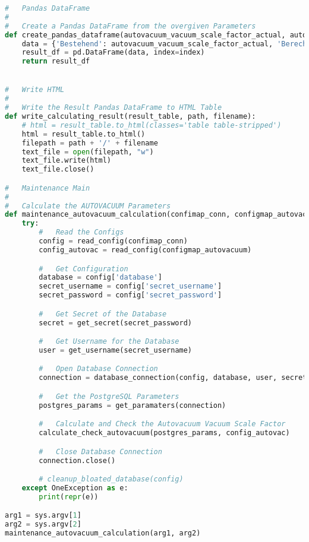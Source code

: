 \begin{flushleft}
\begin{lstlisting}[language=python, caption=Maintenance-Tool - \Gls{AUTOVACUUM} - ksgr\_postgresql\_maintenance\_autovacuum\_calculation.py,captionpos=b,label={lst:maintenannce-tool-autovacuum-python},breaklines=true]
#   Pandas DataFrame
#
#   Create a Pandas DataFrame from the overgiven Parameters
def create_pandas_dataframe(autovacuum_vacuum_scale_factor_actual, autovacuum_vacuum_scale_factor, index):
    data = {'Bestehend': autovacuum_vacuum_scale_factor_actual, 'Berechnet': autovacuum_vacuum_scale_factor}
    result_df = pd.DataFrame(data, index=index)
    return result_df


#   Write HTML
#
#   Write the Result Pandas DataFrame to HTML Table
def write_calculating_result(result_table, path, filename):
    # html = result_table.to_html(classes='table table-stripped')
    html = result_table.to_html()
    filepath = path + '/' + filename
    text_file = open(filepath, "w")
    text_file.write(html)
    text_file.close()

#   Maintenance Main
#
#   Calculate the AUTOVACUUM Parameters
def maintenance_autovacuum_calculation(confimap_conn, configmap_autovacuum):
    try:
        #   Read the Configs
        config = read_config(confimap_conn)
        config_autovac = read_config(configmap_autovacuum)

        #   Get Configuration
        database = config['database']
        secret_username = config['secret_username']
        secret_password = config['secret_password']

        #   Get Secret of the Database
        secret = get_secret(secret_password)

        #   Get Username for the Database
        user = get_username(secret_username)

        #   Open Database Connection
        connection = database_connection(config, database, user, secret)

        #   Get the PostgreSQL Parameters
        postgres_params = get_paramaters(connection)

        #   Calculate and Check the Autovacuum Vacuum Scale Factor
        calculate_check_autovacuum(postgres_params, config_autovac)

        #   Close Database Connection
        connection.close()

        # cleanup_bloated_database(config)
    except OneException as e:
        print(repr(e))

arg1 = sys.argv[1]
arg2 = sys.argv[2]
maintenance_autovacuum_calculation(arg1, arg2)
    \end{lstlisting}
\end{flushleft}
